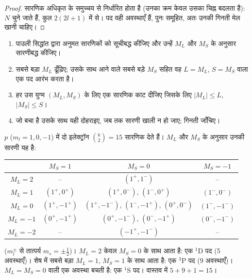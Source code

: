 \begin{proof}
सारणिक अधिकृत  के समुच्चय से निर्धारित होता है (उनका क्रम
केवल उसका चिह्न बदलता है): $N$  चुने जाते हैं, कुल $2(2l+1)$ में से। पद वही
अवस्थाएँ हैं, पुनः समूहित, अतः उनकी गिनती मेल खानी चाहिए।
\end{proof}

\begin{method}[किसी विन्यास के पद]\label{met:b3:many-electron-atoms:terms}
\begin{enumerate}
  \item पाउली सिद्धांत द्वारा अनुमत सारणिकों को सूचीबद्ध कीजिए और उन्हें
        $M_L$ और $M_S$ के अनुसार सारणीबद्ध कीजिए।
  \item सबसे बड़ा $M_L$ ढूँढ़िए; उसके साथ आने वाले सबसे बड़े $M_S$ सहित
        वह $L = M_L$, $S = M_S$ वाला एक पद आरंभ करता है।
  \item हर उस युग्म $(M_L, M_S)$ के लिए एक सारणिक काट दीजिए जिसके लिए
        $|M_L| \le L$, $|M_S| \le S$।
  \item जो बचा है उसके साथ यही दोहराइए, जब तक सारणी खाली न हो जाए; गिनती जाँचिए।
\end{enumerate}
\end{method}

\begin{example}[$p^2$ के पद]\label{ex:b3:many-electron-atoms:p2}
$p$ ($m_l = 1, 0, -1$) में दो इलेक्ट्रॉन $\binom62 = 15$ सारणिक देते हैं।
$M_L$ और $M_S$ के अनुसार उनकी सारणी यह है:
\begin{center}\small
\begin{tabular}{c|ccc}
\hline
 & $M_S = 1$ & $M_S = 0$ & $M_S = -1$\\ \hline
$M_L = 2$ & -- & $(1^+,1^-)$ & --\\
$M_L = 1$ & $(1^+,0^+)$ & $(1^+,0^-)$, $(1^-,0^+)$ & $(1^-,0^-)$\\
$M_L = 0$ & $(1^+,-1^+)$ & $(1^+,-1^-)$, $(1^-,-1^+)$, $(0^+,0^-)$ & $(1^-,-1^-)$\\
$M_L = -1$ & $(0^+,-1^+)$ & $(0^+,-1^-)$, $(0^-,-1^+)$ & $(0^-,-1^-)$\\
$M_L = -2$ & -- & $(-1^+,-1^-)$ & --\\ \hline
\end{tabular}
\end{center}
($m_l^\pm$ से तात्पर्य $m_s = \pm\frac12$)। $M_L = 2$ केवल $M_S = 0$ के साथ आता है:
एक ${}^1$D पद (5 अवस्थाएँ)। शेष में सबसे बड़ा $M_L = 1$,
$M_S = 1$ के साथ आता है: एक ${}^3$P पद (9 अवस्थाएँ)। $M_L = M_S = 0$ वाली एक अवस्था बचती है: एक
${}^1$S पद। वास्तव में $5 + 9 + 1 = 15$।
\end{example}

